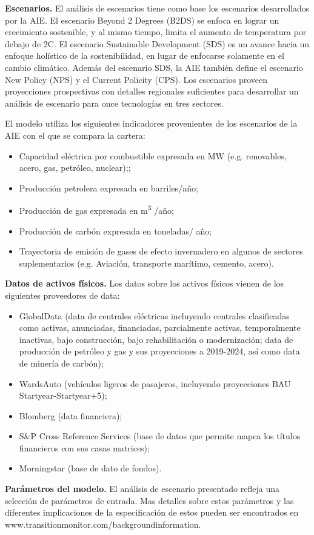\documentclass[10pt,table]{article}\usepackage[]{graphicx}\usepackage[]{color}
\begin{document}
\begin{multicols}{2}
		\textbf{Escenarios.} El análisis de escenarios tiene como base los escenarios desarrollados por la AIE. El escenario Beyond 2 Degrees (B2DS) se enfoca en lograr un crecimiento sostenible, y al mismo tiempo, limita el aumento de temperatura por debajo de 2\degree C. El escenario Sustainable Development (SDS) es un avance hacia un enfoque holístico de la sostenibilidad, en lugar de enfocarse solamente en el cambio climático. Además del escenario SDS, la AIE también define el escenario New Policy (NPS) y el Current Policity (CPS). Los escenarios proveen proyecciones prospectivas con detalles regionales suficientes para desarrollar un análisis de escenario para once tecnologías en tres sectores.
		
			El modelo utiliza los siguientes indicadores provenientes de los escenarios de la AIE con el que se compara la cartera:
	
		\begin{itemize}
			\item{Capacidad eléctrica por combustible expresada en MW (e.g. renovables, acero, gas, petróleo, nuclear);;}
			\item{Producción petrolera expresada en barriles/año;}
			\item{Producción de gas expresada en m\textsuperscript{3} /año;}
			\item{Producción de carbón expresada en toneladas/ año;}
			\item{Trayectoria de emisión de gases de efecto invernadero en algunos de sectores suplementarios (e.g. Aviación, transporte marítimo, cemento, acero).}
		\end{itemize}
		
		 
		\textbf{Datos de activos físicos. } Los datos sobre los activos físicos vienen de los siguientes proveedores de data:
		\begin{itemize}
			\item{GlobalData (data de centrales eléctricas incluyendo centrales clasificadas como activas, anunciadas, financiadas, parcialmente activas, temporalmente inactivas, bajo construcción, bajo rehabilitación o modernización; data de producción de petróleo y gas y sus proyecciones a 2019-2024, así como data de minería de carbón); }
			\item{WardsAuto (vehículos ligeros de pasajeros, incluyendo proyecciones BAU Startyear-Startyear+5); }
			\item{Blomberg (data financiera);}
			\item{S\&P Cross Reference Services (base de datos que permite mapea los títulos financieros con sus casas matrices);}
			\item{Morningstar (base de dato de fondos). }
			
		\end{itemize}
		
		\textbf{Parámetros del modelo.} El análisis de escenario presentado refleja una selección de parámetros de entrada.  Mas detalles sobre estos parámetros y las diferentes implicaciones de la especificación de estos pueden ser encontrados en www.transitionmonitor.com/backgroundinformation.
		
		
		
	\end{multicols}
\end{document}

